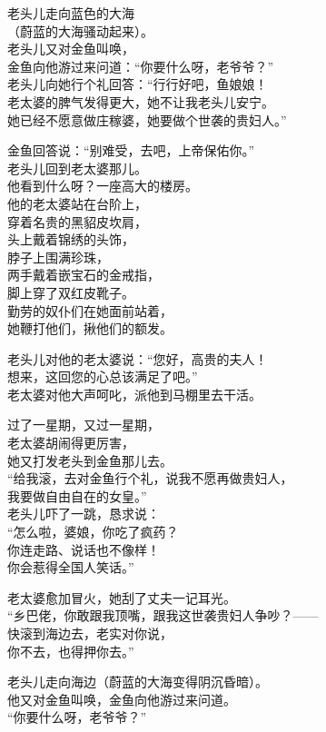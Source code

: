 \documentclass[
]{book}
\renewenvironment{quote}{\begin{VF}}{\end{VF}}
\begin{document}
\begin{quote}
老头儿走向蓝色的大海\\
（蔚蓝的大海骚动起来）。\\
老头儿又对金鱼叫唤，\\
金鱼向他游过来问道：``你要什么呀，老爷爷？''\\
老头儿向她行个礼回答：``行行好吧，鱼娘娘！\\
老太婆的脾气发得更大，她不让我老头儿安宁。\\
她已经不愿意做庄稼婆，她要做个世袭的贵妇人。''

金鱼回答说：``别难受，去吧，上帝保佑你。''\\
老头儿回到老太婆那儿。\\
他看到什么呀？一座高大的楼房。\\
他的老太婆站在台阶上，\\
穿着名贵的黑貂皮坎肩，\\
头上戴着锦绣的头饰，\\
脖子上围满珍珠，\\
两手戴着嵌宝石的金戒指，\\
脚上穿了双红皮靴子。\\
勤劳的奴仆们在她面前站着，\\
她鞭打他们，揪他们的额发。

老头儿对他的老太婆说：``您好，高贵的夫人！\\
想来，这回您的心总该满足了吧。''\\
老太婆对他大声呵叱，派他到马棚里去干活。

过了一星期，又过一星期，\\
老太婆胡闹得更厉害，\\
她又打发老头到金鱼那儿去。\\
``给我滚，去对金鱼行个礼，说我不愿再做贵妇人，\\
我要做自由自在的女皇。''\\
老头儿吓了一跳，恳求说：\\
``怎么啦，婆娘，你吃了疯药？\\
你连走路、说话也不像样！\\
你会惹得全国人笑话。''

老太婆愈加冒火，她刮了丈夫一记耳光。\\
``乡巴佬，你敢跟我顶嘴，跟我这世袭贵妇人争吵？------\\
快滚到海边去，老实对你说，\\
你不去，也得押你去。''

老头儿走向海边（蔚蓝的大海变得阴沉昏暗）。\\
他又对金鱼叫唤，金鱼向他游过来问道。\\
``你要什么呀，老爷爷？''


\end{quote}
\end{document}
